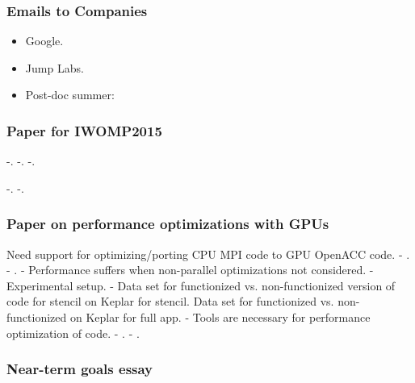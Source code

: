 \begin{frame}
  \frametitle{Emails to Companies}
  \begin{itemize}
    \tiny \item \tiny Google.
  \item \tiny Jump Labs. 
  \item \tiny Post-doc summer: 
  \end{itemize} 
\end{frame} 

\begin{frame} 
\frametitle{ } 

\end{frame} 

\begin{frame}[label=iw15papoutline]
\frametitle{Paper for IWOMP2015} 
\begin{outline}[enumerate]
\tiny \1 {\tiny -.} 
\tiny \2 {\tiny -.}
\tiny \2 {\tiny -.}

\tiny \1 {\tiny -.} 
\tiny \2 {\tiny -.} 

\end{outline}
\end{frame} 


\begin{frame}
\frametitle{Paper on performance optimizations with GPUs}
\begin{outline}[enumerate]  
\tiny \1 {\tiny Need support for optimizing/porting CPU MPI
  code to GPU OpenACC code.} 
\tiny \2 {\tiny - .} 
\tiny \2 {\tiny - .}  
\tiny \1 {\tiny - Performance suffers when non-parallel optimizations
  not considered. } 
\tiny \1 {\tiny - Experimental setup.}
\tiny \2 {\tiny - Data set for functionized vs. non-functionized
  version of code for stencil on Keplar for stencil.} 
\tiny \2 {\tiny Data set for functionized vs. non-functionized on
  Keplar for full app.} 
\tiny \1 {\tiny -  Tools are necessary for performance optimization of
  code.} 
\tiny \2 {\tiny -  .} 
\tiny \2 {\tiny -  .} 
\end{outline}
\end{frame} 

\begin{frame}
\frametitle{Near-term goals essay}
\end{frame}


